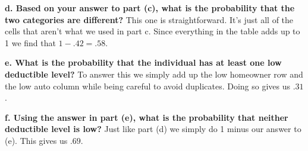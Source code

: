 \textbf{d. Based on your answer to part (c), what is the probability that the two categories are different?} \newline 
This one is straightforward. It's just all of the cells that aren't what we used in part c. Since everything in the table adds up to 1 we find that $1 - .42 = \boxed{.58}$.

\textbf{e. What is the probability that the individual has at least one low deductible level?} \newline 
To answer this we simply add up the low homeowner row and the low auto column while being careful to avoid duplicates. Doing so gives us $\boxed{.31}$.

\textbf{f. Using the answer in part (e), what is the probability that neither deductible level is low?} \newline 
Just like part (d) we simply do 1 minus our answer to (e). This gives us $\boxed{.69}$.


